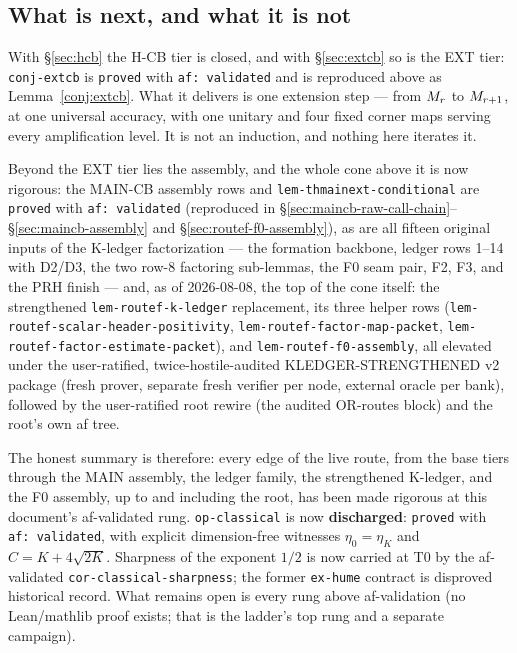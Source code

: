\subsection*{What is next, and what it is not}

With \S\ref{sec:hcb} the H-CB tier is closed, and with \S\ref{sec:extcb} so is the EXT
tier: \texttt{conj-extcb} is \texttt{proved} with \texttt{af: validated} and is reproduced
above as Lemma~\ref{conj:extcb}. What it delivers is one extension step --- from
$M_{r}$ to $M_{r+1}$, at one universal accuracy, with one unitary and four fixed
corner maps serving every amplification level. It is not an induction, and nothing here
iterates it.

Beyond the EXT tier lies the assembly, and the whole cone above it is now rigorous: the
MAIN-CB assembly rows and \texttt{lem-thmainext-conditional} are \texttt{proved} with
\texttt{af: validated} (reproduced in
\S\ref{sec:maincb-raw-call-chain}--\S\ref{sec:maincb-assembly} and
\S\ref{sec:routef-f0-assembly}), as are all fifteen original inputs of the
K-ledger factorization --- the formation backbone, ledger rows 1--14 with D2/D3, the two
row-8 factoring sub-lemmas, the F0 seam pair, F2, F3, and the PRH finish --- and, as of
2026-08-08, the top of the cone itself: the strengthened \texttt{lem-routef-k-ledger}
replacement, its three helper rows
(\texttt{lem-routef-scalar-header-positivity},
\texttt{lem-routef-factor-map-packet},
\texttt{lem-routef-factor-estimate-packet}), and
\texttt{lem-routef-f0-assembly}, all elevated under the user-ratified,
twice-hostile-audited KLEDGER-STRENGTHENED v2 package (fresh prover, separate fresh
verifier per node, external oracle per bank), followed by the user-ratified root rewire
(the audited OR-routes block) and the root's own af tree.

The honest summary is therefore: every edge of the live route, from the base tiers
through the MAIN assembly, the ledger family, the strengthened K-ledger, and the F0
assembly, up to and including the root, has been made rigorous at this document's
af-validated rung.
\texttt{op-classical} is now \textbf{discharged}: \texttt{proved} with
\texttt{af: validated}, with explicit dimension-free witnesses
$\eta_0=\eta_K$ and $C=K+4\sqrt{2K}$. Sharpness of the exponent $1/2$ is now carried
at T0 by the af-validated \texttt{cor-classical-sharpness}; the former
\texttt{ex-hume} contract is disproved historical record. What remains open is every
rung above af-validation (no Lean/mathlib proof exists; that is the ladder's top rung
and a separate campaign).

